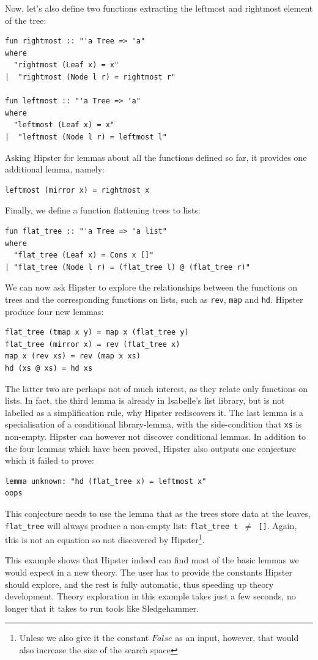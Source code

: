 Now, let's also define two functions extracting the leftmost and rightmost element of the tree:
\begin{verbatim}
fun rightmost :: "'a Tree => 'a"
where 
  "rightmost (Leaf x) = x"
|  "rightmost (Node l r) = rightmost r"

fun leftmost :: "'a Tree => 'a"
where 
  "leftmost (Leaf x) = x"
|  "leftmost (Node l r) = leftmost l"
\end{verbatim}
Asking Hipster for lemmas about all the functions defined so far, it provides one additional lemma, namely:
\begin{verbatim}
leftmost (mirror x) = rightmost x
\end{verbatim}
Finally, we define a function flattening trees to lists:
\begin{verbatim}
fun flat_tree :: "'a Tree => 'a list"
where
  "flat_tree (Leaf x) = Cons x []"
| "flat_tree (Node l r) = (flat_tree l) @ (flat_tree r)"
\end{verbatim}
We can now ask Hipster to explore the relationships between the functions on trees and the corresponding functions on lists, such as \texttt{rev}, \texttt{map} and \texttt{hd}. Hipster produce four new lemmas:
\begin{verbatim}
flat_tree (tmap x y) = map x (flat_tree y)
flat_tree (mirror x) = rev (flat_tree x)
map x (rev xs) = rev (map x xs)
hd (xs @ xs) = hd xs
\end{verbatim}
The latter two are perhaps not of much interest, as they relate only functions on lists. In fact, the third lemma is already in Isabelle's list library, but is not labelled as a simplification rule, why Hipster rediscovers it. The last lemma is a specialisation of a conditional library-lemma, with the side-condition that \texttt{xs} is non-empty. Hipster can however not discover conditional lemmas. In addition to the four lemmas which have been proved, Hipster also outputs one conjecture which it failed to prove:
\begin{verbatim}
lemma unknown: "hd (flat_tree x) = leftmost x"
oops
\end{verbatim}
This conjecture needs to use the lemma that as the trees store data at the leaves, \texttt{flat\_tree} will always produce a non-empty list: \texttt{flat\_tree t $\neq$ []}. Again, this is not an equation so not discovered by Hipster\footnote{Unless we also give it the constant $False$ as an input, however, that would also increase the size of the search space}. 
 
This example shows that Hipster indeed can find most of the basic lemmas we would expect in a new theory. The user has to provide the constants Hipster should explore, and the rest is fully automatic, thus speeding up theory development. Theory exploration in this example takes just a few seconds, no longer that it takes to run tools like Sledgehammer. 


